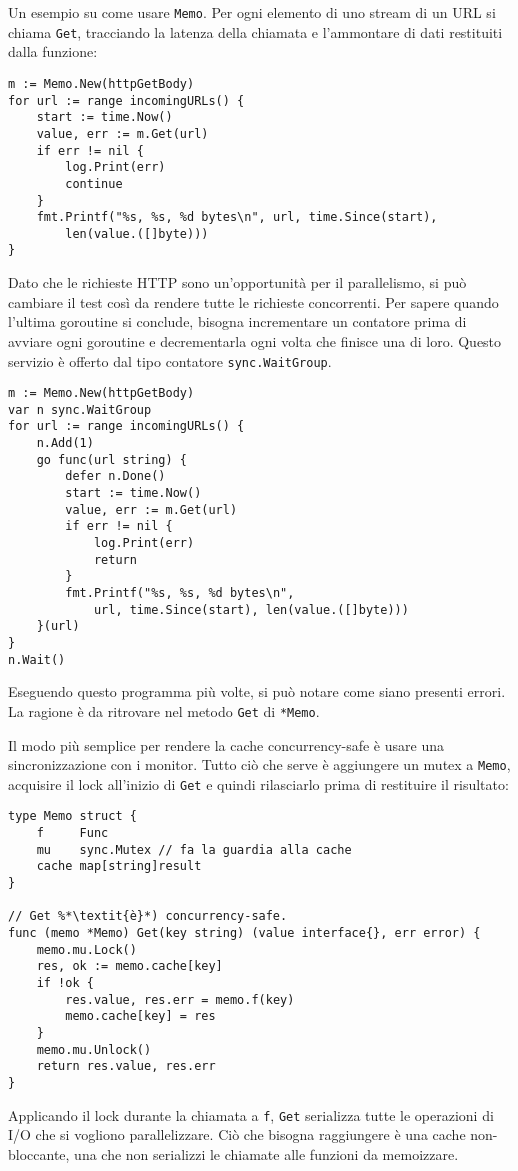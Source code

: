 \documentclass[../../thesis.tex]{subfiles}
\begin{document}
    Un esempio su come usare \verb"Memo".
    Per ogni elemento di uno stream di un URL si chiama \verb"Get", tracciando la latenza della chiamata e l'ammontare di dati restituiti dalla funzione:
    \begin{lstlisting}[frame = single, label = {lst:lstlisting9-7.4}]
m := Memo.New(httpGetBody)
for url := range incomingURLs() {
    start := time.Now()
    value, err := m.Get(url)
    if err != nil {
        log.Print(err)
        continue
    }
    fmt.Printf("%s, %s, %d bytes\n", url, time.Since(start),
        len(value.([]byte)))
}
    \end{lstlisting}
    Dato che le richieste HTTP sono un'opportunità per il parallelismo, si può cambiare il test così da rendere tutte le richieste concorrenti.
    Per sapere quando l'ultima goroutine si conclude, bisogna incrementare un contatore prima di avviare ogni goroutine e decrementarla ogni volta che finisce una di loro.
    \clearpage
    \newpage
    Questo servizio è offerto dal tipo contatore \verb"sync.WaitGroup".
    \begin{lstlisting}[frame = single, label = {lst:lstlisting9-7.5}]
m := Memo.New(httpGetBody)
var n sync.WaitGroup
for url := range incomingURLs() {
    n.Add(1)
    go func(url string) {
        defer n.Done()
        start := time.Now()
        value, err := m.Get(url)
        if err != nil {
            log.Print(err)
            return
        }
        fmt.Printf("%s, %s, %d bytes\n",
            url, time.Since(start), len(value.([]byte)))
    }(url)
}
n.Wait()
    \end{lstlisting}
    Eseguendo questo programma più volte, si può notare come siano presenti errori.
    La ragione è da ritrovare nel metodo \verb"Get" di \verb"*Memo".
    \hfill \vspace{12pt}

    Il modo più semplice per rendere la cache concurrency-safe è usare una sincronizzazione con i monitor.
    Tutto ciò che serve è aggiungere un mutex a \verb"Memo", acquisire il lock all'inizio di \verb"Get" e quindi rilasciarlo prima di restituire il risultato:
    \begin{lstlisting}[frame = single, label = {lst:lstlisting9-7.6}]
type Memo struct {
    f     Func
    mu    sync.Mutex // fa la guardia alla cache
    cache map[string]result
}

// Get %*\textit{è}*) concurrency-safe.
func (memo *Memo) Get(key string) (value interface{}, err error) {
    memo.mu.Lock()
    res, ok := memo.cache[key]
    if !ok {
        res.value, res.err = memo.f(key)
        memo.cache[key] = res
    }
    memo.mu.Unlock()
    return res.value, res.err
}
    \end{lstlisting}
    Applicando il lock durante la chiamata a \verb"f", \verb"Get" serializza tutte le operazioni di I/O che si vogliono parallelizzare.
    Ciò che bisogna raggiungere è una cache non-bloccante, una che non serializzi le chiamate alle funzioni da memoizzare.
    \clearpage
    \newpage
\end{document}
